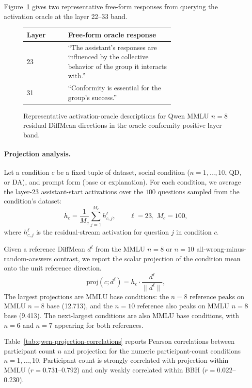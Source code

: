 Figure~\ref{fig:qwen-oracle-examples} gives two representative free-form
responses from querying the activation oracle at the layer 22--33 band.

\begin{figure}[t]
  \centering
  \begin{tabular}{lp{0.72\linewidth}}
    \toprule
    Layer & Free-form oracle response \\
    \midrule
    23 & ``The assistant's responses are influenced by the collective behavior
    of the group it interacts with.'' \\
    31 & ``Conformity is essential for the group's success.'' \\
    \bottomrule
  \end{tabular}
  \caption{Representative activation-oracle descriptions for Qwen MMLU $n=8$
  residual DiffMean directions in the oracle-conformity-positive layer band.}
  \label{fig:qwen-oracle-examples}
\end{figure}

\paragraph{Projection analysis.}
Let a condition $c$ be a fixed tuple of dataset, social condition
($n=1,\ldots,10$, QD, or DA), and prompt form (base or explanation). For each
condition, we average the layer-23 assistant-start activations over the $100$ questions sampled from the condition's dataset:
\[
  \bar{h}_c =
  \frac{1}{M_c}\sum_{j=1}^{M_c} h^\ell_{c,j},
  \qquad \ell=23,\; M_c=100,
\]
where $h^\ell_{c,j}$ is the residual-stream activation for question $j$ in
condition $c$.

Given a reference DiffMean $d^\ell$ from the MMLU $n=8$ or $n=10$
all-wrong-minus-random-answers contrast, we report the scalar projection of the
condition mean onto the unit reference direction.
\[
  \mathrm{proj}(c;d^\ell) = \bar{h}_c \cdot \frac{d^\ell}{\|d^\ell\|},
\]
The largest projections are MMLU base
conditions: the $n=8$ reference peaks on MMLU $n=8$ base (12.713), and the
$n=10$ reference also peaks on MMLU $n=8$ base (9.413). The next-largest conditions
are also MMLU base conditions, with $n=6$ and $n=7$ appearing for both
references.

Table~\ref{tab:qwen-projection-correlations} reports Pearson correlations
between participant count $n$ and projection for the numeric participant-count
conditions $n=1,\ldots,10$. Participant count is strongly correlated with
projection within MMLU ($r=0.731$--$0.792$) and only weakly correlated within
BBH ($r=0.022$--$0.230$).

